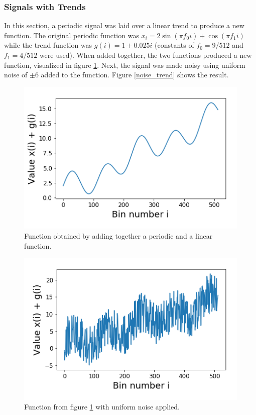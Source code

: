 \documentclass[twocolumn]{article}
\begin{document}
\subsubsection{Signals with Trends}
In this section, a periodic signal was laid over a linear trend to produce a new function. The original periodic function was $x_i = 2\sin(\pi f_0 i) + \cos( \pi f_1 i)$ while the trend function was $g(i) = 1 + 0.025i$ (constants of $f_0 = 9/512$ and $f_1=4/512$ were used). When added together, the two functions produced a new function, visualized in figure \ref{fig:trend}.
Next, the signal was made noisy using uniform noise of $\pm6$ added to the function. Figure \ref{noise_trend} shows the result.

\begin{figure}
\centering
\includegraphics[width=\linewidth]{trend}
\caption{Function obtained by adding together a periodic and a linear function.}
\label{fig:trend}
\end{figure}

\begin{figure}
\centering
\includegraphics[width=\linewidth]{noise_trend}
\caption{Function from figure \ref{fig:trend} with uniform noise applied.}
\label{fig:noise_trend}
\end{figure}
\end{document}
